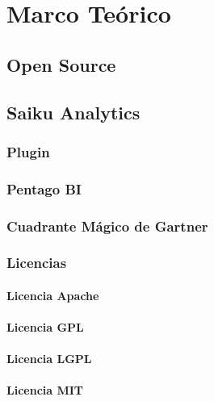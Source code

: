 \chapter{Marco Teórico} \label{chapter:II}
\section{Open Source}
		\lipsum[1-2]
\section{Saiku Analytics}
	\subsection{Plugin}
			\lipsum[1-2]
	\subsection{Pentago BI}
			\lipsum[1-2]
	\subsection{Cuadrante M\'{a}gico de Gartner}
			\lipsum[1-2]
	\subsection{Licencias}
			\lipsum[1-2]
		\subsubsection{Licencia Apache}
				\lipsum[1-2]
		\subsubsection{Licencia GPL}
				\lipsum[1-2]
		\subsubsection{Licencia LGPL}
				\lipsum[1-2]
		\subsubsection{Licencia MIT}
				\lipsum[1-2]
